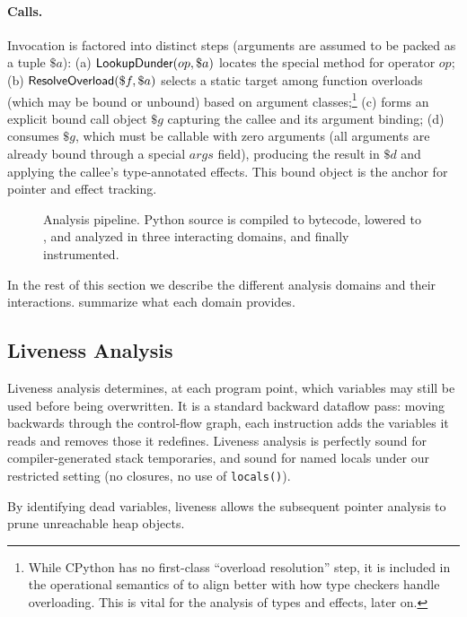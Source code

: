 \paragraph{Calls.}
Invocation is factored into distinct steps (arguments are assumed to be packed as a tuple
$\$a$): (a) $\textsf{LookupDunder}(op,\$a)$ locates the special method
for operator $op$; (b) $\textsf{ResolveOverload}(\$f,\$a)$ selects a static target among function overloads (which may be bound or unbound) based on argument classes;\footnote{While CPython has no first-class ``overload resolution'' step, it is included in the operational semantics of \spytecode to align better with how type checkers handle overloading. This is vital for the analysis of types and effects, later on.}
(c) \tBind forms an explicit bound call object $\$g$ capturing the callee and its
argument binding; (d) \tCall consumes $\$g$, which must be callable with zero arguments (all arguments are already bound through a special $args$ field), producing the result in $\$d$ and applying the callee's type-annotated effects. This bound object is the anchor for
pointer and effect tracking.

\begin{figure}[t]
    \centering
    
    \caption{Analysis pipeline. Python source is compiled to bytecode, lowered to \spytecode, and analyzed in three interacting domains, and finally instrumented.}
    \label{fig:overview}
\end{figure}

In the rest of this section we describe the different analysis domains and their interactions.  summarize what each domain provides.

\subsection{Liveness Analysis}
\label{sec:liveness}

Liveness analysis determines, at each program point, which \spytecode variables may still be used before being overwritten.  
It is a standard backward dataflow pass: moving backwards through the control-flow graph, each instruction adds the variables it reads and removes those it redefines.  Liveness analysis is perfectly sound for compiler-generated stack temporaries, and sound for named locals under our restricted setting (no closures, no use of \texttt{locals()}).

By identifying dead variables, liveness allows the subsequent pointer analysis to prune unreachable heap objects.

